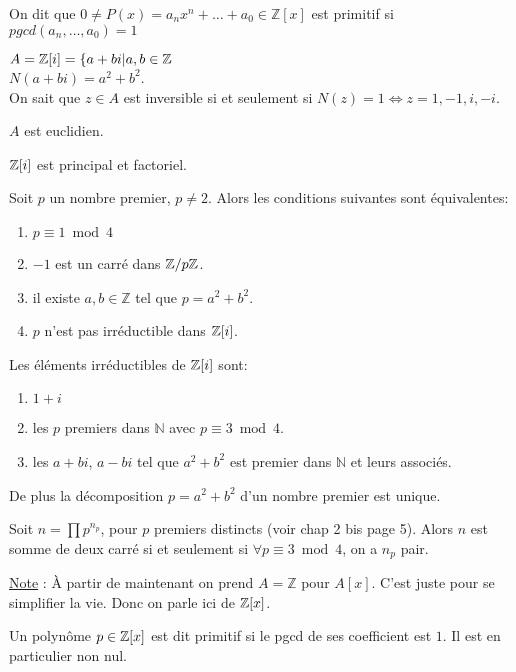 \documentclass[12pt,a4paper]{article}
\begin{document}
\begin{flushleft}
\begin{rem}
On dit que $0 \neq P(x) = a_n x^n + \ldots + a_0 \in \mathbb{Z} [x]$ est primitif si $pgcd(a_n , \ldots , a_0) = 1$
\end{rem}

\begin{mydef}
$A = \mathbb{Z} [i] = \{ a + bi | a,b \in \mathbb{Z}$\\
$N(a + bi) = a^2 + b^2$.\\
On sait que $z \in A$ est inversible si et seulement si $N(z) = 1 \Leftrightarrow z = 1, -1, i, -i$.
\end{mydef}

\begin{thm}
$A$ est euclidien.
\end{thm}

\begin{cor}
$\mathbb{Z} [i]$ est principal et factoriel.
\end{cor}

\begin{thm}
Soit $p$ un nombre premier, $p \neq 2$. Alors les conditions suivantes sont équivalentes:
\begin{enumerate}
\item $p \equiv 1 \bmod 4$
\item $-1$ est un carré dans $\mathbb{Z} / p \mathbb{Z}$.
\item il existe $a, b \in \mathbb{Z}$ tel que $p = a^2 + b^2$.
\item $p$ n'est pas irréductible dans $\mathbb{Z} [i]$.
\end{enumerate}
\end{thm}

\begin{cor}
Les éléments irréductibles de $\mathbb{Z} [i]$ sont:
\begin{enumerate}
\item $1+i$
\item les $p$ premiers dans $\mathbb{N}$ avec $p \equiv 3 \bmod 4$.
\item les $a + bi$, $a - bi$ tel que $a^2 + b^2 $ est premier dans $\mathbb{N}$ et leurs associés.
\end{enumerate}
De plus la décomposition $p = a^2 + b^2$ d'un nombre premier est unique.
\end{cor}

\begin{cor}
Soit $n = \prod p^{n_p}$, pour $p$ premiers distincts (voir chap 2 bis page 5). Alors $n$ est somme de deux carré si et seulement si $\forall p \equiv 3 \bmod 4$, on a $n_p$ pair.
\end{cor}

\underline{Note} : À partir de maintenant on prend $A = \mathbb{Z}$ pour $A[x]$. C'est juste pour se simplifier la vie. Donc on parle ici de $\mathbb{Z} [x]$.

\begin{mydef}
Un polynôme $p \in \mathbb{Z} [x]$ est dit primitif si le pgcd de ses coefficient est $1$. Il est en particulier non nul.
\end{mydef}



\end{flushleft}


 
\end{document}
